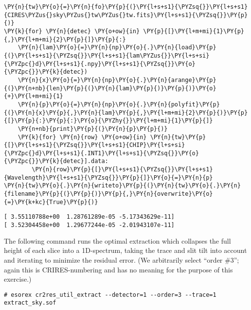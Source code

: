     \begin{tcolorbox}[breakable, size=fbox, boxrule=1pt, pad at break*=1mm,colback=cellbackground, colframe=cellborder]
\begin{Verbatim}[commandchars=\\\{\}]
\PY{n}{tw}\PY{o}{=}\PY{n}{fo}\PY{p}{(}\PY{l+s+s1}{\PYZsq{}}\PY{l+s+s1}{CIRES\PYZus{}sky\PYZus{}tw\PYZus{}tw.fits}\PY{l+s+s1}{\PYZsq{}}\PY{p}{)}
\PY{k}{for} \PY{n}{detec} \PY{o+ow}{in} \PY{p}{[}\PY{l+m+mi}{1}\PY{p}{,}\PY{l+m+mi}{2}\PY{p}{]}\PY{p}{:}
    \PY{n}{lam}\PY{o}{=}\PY{n}{np}\PY{o}{.}\PY{n}{load}\PY{p}{(}\PY{l+s+s1}{\PYZsq{}}\PY{l+s+s1}{lam\PYZus{}}\PY{l+s+si}{\PYZpc{}d}\PY{l+s+s1}{.npy}\PY{l+s+s1}{\PYZsq{}}\PY{o}{\PYZpc{}}\PY{k}{detec})
    \PY{n}{x}\PY{o}{=}\PY{n}{np}\PY{o}{.}\PY{n}{arange}\PY{p}{(}\PY{n+nb}{len}\PY{p}{(}\PY{n}{lam}\PY{p}{)}\PY{p}{)}\PY{o}{+}\PY{l+m+mi}{1} 
    \PY{n}{p}\PY{o}{=}\PY{n}{np}\PY{o}{.}\PY{n}{polyfit}\PY{p}{(}\PY{n}{x}\PY{p}{,}\PY{n}{lam}\PY{p}{,}\PY{l+m+mi}{2}\PY{p}{)}\PY{p}{[}\PY{p}{:}\PY{p}{:}\PY{o}{\PYZhy{}}\PY{l+m+mi}{1}\PY{p}{]}
    \PY{n+nb}{print}\PY{p}{(}\PY{n}{p}\PY{p}{)}
    \PY{k}{for} \PY{n}{row} \PY{o+ow}{in} \PY{n}{tw}\PY{p}{[}\PY{l+s+s1}{\PYZsq{}}\PY{l+s+s1}{CHIP}\PY{l+s+si}{\PYZpc{}d}\PY{l+s+s1}{.INT1}\PY{l+s+s1}{\PYZsq{}}\PY{o}{\PYZpc{}}\PY{k}{detec}].data:
        \PY{n}{row}\PY{p}{[}\PY{l+s+s1}{\PYZsq{}}\PY{l+s+s1}{Wavelength}\PY{l+s+s1}{\PYZsq{}}\PY{p}{]}\PY{o}{=}\PY{n}{p}
\PY{n}{tw}\PY{o}{.}\PY{n}{writeto}\PY{p}{(}\PY{n}{tw}\PY{o}{.}\PY{n}{filename}\PY{p}{(}\PY{p}{)}\PY{p}{,}\PY{n}{overwrite}\PY{o}{=}\PY{k+kc}{True}\PY{p}{)}
\end{Verbatim}
\end{tcolorbox}

    \begin{Verbatim}[commandchars=\\\{\}]
[ 3.55110788e+00  1.28761289e-05 -5.17343629e-11]
[ 3.52304458e+00  1.29677244e-05 -2.01943107e-11]
    \end{Verbatim}

The following command runs the optimal extraction which collapses the
full height of each slice into a 1D-spectrum, taking the trace and slit
tilt into account and iterating to minimize the residual error. (We
arbitrarily select ``order \#3''; again this is CRIRES-numbering and has
no meaning for the purpose of this exercise.)

\begin{verbatim}
# esorex cr2res_util_extract --detector=1 --order=3 --trace=1 extract_sky.sof
\end{verbatim}

